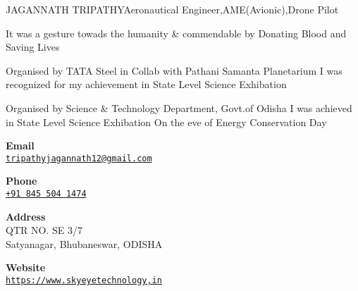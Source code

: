 \documentclass{article}
\begin{document}
\begin{cv}{JAGANNATH TRIPATHY}{Aeronautical Engineer,AME(Avionic),Drone Pilot}
\begin{cvevent}[2017]
    It was a gesture towads the humanity & commendable by Donating Blood and Saving Lives
\end{cvevent}

\cvseparator[2]
\begin{cvevent}[2015]
    Organised by TATA Steel in Collab with Pathani Samanta Planetarium
I was recognized for my achievement in State Level Science Exhibation
\end{cvevent}

\cvseparator[2]
\begin{cvevent}[2013]
   Organised by Science & Technology Department, Govt.of Odisha
I was achieved in State Level Science Exhibation On the eve of Energy Conservation Day
\end{cvevent}


\cvsidebar %



\begin{cvitem}[Envelope][4]
    \textbf{Email}\\
    \href{tripathyjagannath12@gmail.com}{\texttt{tripathyjagannath12@gmail.com}}
\end{cvitem}

\cvseparator[3]
\begin{cvitem}[Phone][4]
    \textbf{Phone}\\
    \href{tel:+918455041474}{\texttt{+91 845 504 1474}}
\end{cvitem}

\cvseparator[3]
\begin{cvitem}[Home][4]
    \textbf{Address}\\
    QTR NO. SE 3/7\\ Satyanagar, Bhubaneswar, ODISHA
\end{cvitem}

\cvseparator[3]
\begin{cvitem}[Globe][4]
    \textbf{Website}\\
    \href{https://www.linkedin.com/company/82144203/admin/feed/posts/}{\texttt{https://www.skyeyetechnology,in}}
\end{cvitem}




\end{cv}
\end{document}
